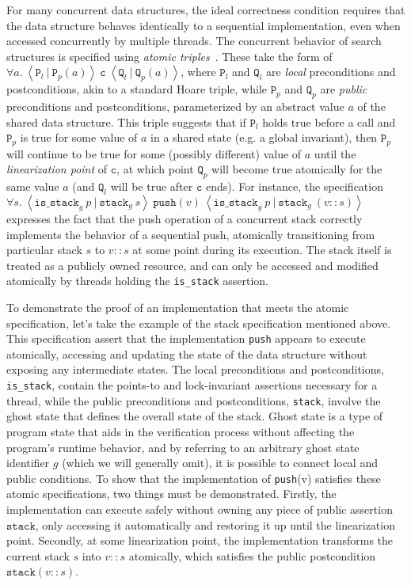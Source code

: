 \documentclass[a4paper,UKenglish,cleveref, autoref, thm-restate]{lipics-v2021}
\begin{document}
For many concurrent data structures, the ideal correctness condition requires that the data structure behaves identically to a sequential implementation, even when accessed concurrently by multiple threads. The concurrent behavior of search structures is specified using \emph{atomic triples}~\cite{tada}. These take the form of $\forall a.\ \left\langle \texttt{P}_l\ |\ \texttt{P}_p(a) \right\rangle\ \texttt{c}\ \left\langle \texttt{Q}_l\ |\ \texttt{Q}_p(a)\right\rangle$, where $\texttt{P}_l$ and $\texttt{Q}_l$ are \emph{local} preconditions and postconditions, akin to a standard Hoare triple, while $\texttt{P}_p$ and $\texttt{Q}_p$ are \emph{public} preconditions and postconditions, parameterized by an abstract value $a$ of the shared data structure. This triple suggests that if $\texttt{P}_l$ holds true before a call and $\texttt{P}_p$ is true for some value of $a$ in a shared state (e.g. a global invariant), then $\texttt{P}_p$ will continue to be true for some (possibly different) value of $a$ until the \emph{linearization point} of $\texttt{c}$, at which point $\texttt{Q}_p$ will become true atomically for the same value $a$ (and $\texttt{Q}_l$ will be true after $\texttt{c}$ ends). For instance, the specification
$\forall s.\ \left\langle \texttt{is\_stack}_g\ p\ |\ \texttt{stack}_g\ s\right\rangle\ \texttt{push}(v)\ \left\langle \texttt{is\_stack}_g\ p\ |\ \texttt{stack}_g\ (v::s)\right\rangle$
expresses the fact that the push operation of a concurrent stack correctly implements the behavior of a sequential push, atomically transitioning from particular stack $s$ to $v::s$ at some point during its execution. The stack itself is treated as a publicly owned resource, and can only be accessed and modified atomically by threads holding the \texttt{is\_stack} assertion.

To demonstrate the proof of an implementation that meets the atomic specification, let's take the example of the stack specification mentioned above. This specification assert that the implementation \texttt{push} appears to execute atomically, accessing and updating the state of the data structure without exposing any intermediate states. The local preconditions and postconditions, \texttt{is\_stack}, contain the points-to and lock-invariant assertions necessary for a thread, while the public preconditions and postconditions, \texttt{stack}, involve the ghost state that defines the overall state of the stack. Ghost state is a type of program state that aids in the verification process without affecting the program's runtime behavior, and by referring to an arbitrary ghost state identifier $g$ (which we will generally omit), it is possible to connect local and public conditions. To show that the implementation of \texttt{push}(v) satisfies these atomic specifications, two things must be demonstrated. Firstly, the implementation can execute safely without owning any piece of public assertion $\texttt{stack}$, only accessing it automatically and restoring it up until the linearization point. Secondly, at some linearization point, the implementation transforms the current stack $s$ into $v::s$ atomically, which satisfies the public postcondition $\texttt{stack}(v::s)$. 
\end{document}
